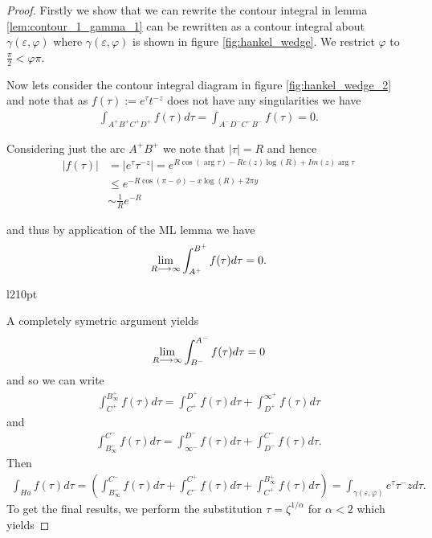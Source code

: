 \begin{proof}

Firstly we show that we can rewrite the contour integral in lemma \ref{lem:contour_1_gamma_1} can be rewritten as a contour
integral about $ \gamma(\varepsilon, \varphi) $ where $ \gamma(\varepsilon, \varphi) $ is shown in figure \ref{fig:hankel_wedge}. We restrict $ \varphi $ to $ \frac{\pi}{2} < \varphi \pi $. 

Now lets consider the contour integral diagram in figure \ref{fig:hankel_wedge_2} and note that as $ f(\tau) := e^\tau t^{-z} $ does not have any singularities we have
\begin{align}
    \int_{A^+ B^+ C^+ D^+} f(\tau) d\tau = \int_{A^-D^-C^-B^-} f(\tau) = 0.
\end{align}

Considering just the arc $ A^+B^+ $ we note that $ |\tau| = R $ and hence
\begin{align}
    |f(\tau)| &= |e^\tau \tau^{-z}| = e^{R\cos(\arg \tau) - Re(z) \log(R) + Im(z) \arg \tau} \\
      &\leq e^{-R\cos(\pi - \phi) - x \log(R) + 2 \pi y} \\
      &\sim \frac{1}{R}e^{-R}
\end{align}

and thus by application of the ML lemma we have
\begin{align}
    \lim_{R \longrightarrow \infty} \int_{A^+}^{B^+} f(\tau) d\tau = 0.
\end{align}

\begin{wrapfigure}{l}{210pt}
    
    \caption{The Hankel countour $ \gamma(\varepsilon, \varphi) $}
    \label{fig:hankel_wedge}
\end{wrapfigure}

A completely symetric argument yields
\begin{align}
    \lim_{R \longrightarrow \infty} \int_{B^-}^{A^-} f(\tau) d\tau = 0
\end{align}
and so we can write
\begin{align}
    \int_{C^+}^{B_\infty^+} f(\tau)d\tau = \int_{C^+}^{D^+} f(\tau)d\tau + \int_{D^+}^{\infty^+} f(\tau)d\tau
\end{align}
and
\begin{align}
    \int_{B_\infty^-}^{C^-} f(\tau)d\tau = \int_{\infty^-}^{D^-} f(\tau)d\tau + \int_{D^-}^{C^-} f(\tau)d\tau.
\end{align}
Then
\begin{align}
    \int_{Ha} f(\tau) d\tau = \left( \int_{B_\infty^-}^{C^-} f(\tau)d\tau + \int_{C^-}^{C^+} f(\tau)d\tau +  \int_{C^+}^{B_\infty^+} f(\tau)d\tau \right) = \int_{\gamma(\varepsilon, \varphi)}e^\tau \tau^-z d\tau.
\end{align}
To get the final results, we perform the substitution $ \tau = \zeta^{1/\alpha} $ for $ \alpha < 2 $
which yields


\end{proof}

